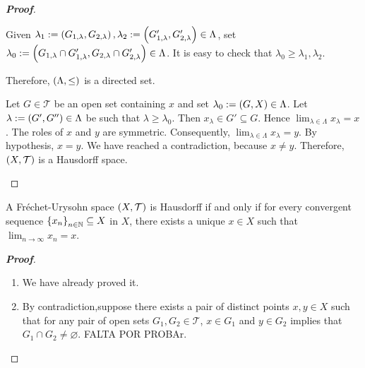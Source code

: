 \begin{proposition}
\begin{proof}[\rm\textbf{Proof}]
\begin{enumerate}
      Given $\lambda_1:=\left(G_{1,\lambda},G_{2,\lambda}\right),\lambda_2:=\left(G_{1,\lambda}',G_{2,\lambda}'\right)\in\Lambda$, set $\lambda_0:=\left(G_{1,\lambda}\cap G_{1,\lambda}',G_{2,\lambda}\cap G_{2,\lambda}'\right)\in\Lambda$. It is easy to check that $\lambda_0\geq\lambda_1,\lambda_2$.

      Therefore, $\left(\Lambda,\leq\right)$ is a directed set.

      Let $G\in\mathcal{T}$ be an open set containing $x$ and set $\lambda_0:=\left(G,X\right)\in\Lambda$. Let $\lambda:=\left(G',G''\right)\in\Lambda$ be such that $\lambda\geq\lambda_0$. Then $x_{\lambda}\in G'\subseteq G$. Hence $\lim_{\lambda\in\Lambda}{x_{\lambda}}=x$. The roles of $x$ and $y$ are symmetric. Consequently, $\lim_{\lambda\in\Lambda}{x_{\lambda}}=y$. By hypothesis, $x=y$. We have reached a contradiction, because $x\neq y$. Therefore, $\left(X,\mathcal{T}\right)$ is a Hausdorff space.
    \end{enumerate}
  \end{proof}
\end{proposition}

\begin{proposition}
  A Fréchet-Urysohn space $\left(X,\mathcal{T}\right)$ is Hausdorff if and only if for every convergent sequence $\left\{x_n\right\}_{n\in\mathbb{N}}\subseteq X$ in $X$, there exists a unique $x\in X$ such that $\lim_{n\to\infty}{x_n}=x$.

  \begin{proof}[\rm\textbf{Proof}]
    \hfill
    \begin{enumerate}
      \item[\boxed{\Rightarrow}] We have already proved it.
      \item[\boxed{\Leftarrow}] By contradiction,suppose there exists a pair of distinct points $x,y\in X$ such that for any pair of open sets $G_1,G_2\in\mathcal{T}$, $x\in G_1$ and $y\in G_2$ implies that $G_1\cap G_2\neq\varnothing$. FALTA POR PROBAr.
    \end{enumerate}
  \end{proof}
\end{proposition}

